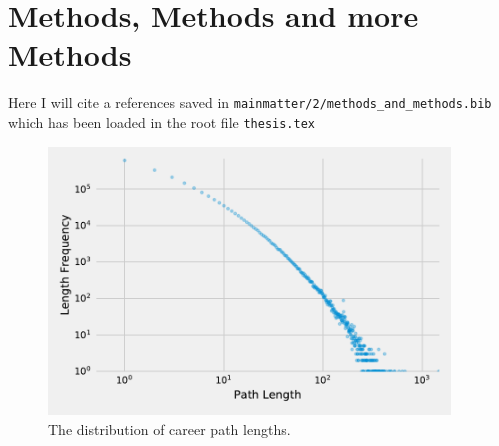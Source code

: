 
\graphicspath{{mainmatter/2/figures/}}

\chapter{Methods, Methods and more Methods}\label{ch:methods}

Here I will cite \citet{Torvik2009} a references saved in \texttt{mainmatter/2/methods\_and\_methods.bib} which has been loaded in the root file \texttt{thesis.tex}

\begin{figure}[htbp]
    \centering
    \includegraphics[width=0.95\textwidth]{mainmatter/2/figures/path_distribution.pdf}
    \caption{The distribution of career path lengths.}
    \label{fig:path_distribution}
\end{figure}

